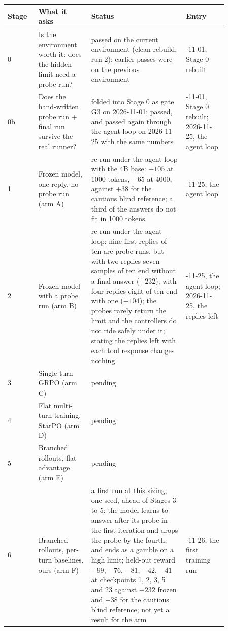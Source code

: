 \documentclass[11pt,a4paper]{article}
\begin{document}
\begin{center}\footnotesize
\begin{tabular}{@{}l >{\raggedright\arraybackslash}p{0.24\linewidth} >{\raggedright\arraybackslash}p{0.43\linewidth} >{\raggedright\arraybackslash}p{0.19\linewidth}@{}}
\toprule
Stage & What it asks & Status & Entry \\
\midrule
0  & Is the environment worth it: does the hidden limit need a probe run? & passed on the current environment (clean rebuild, run 2); earlier passes were on the previous environment & 2026-11-01, Stage 0 rebuilt \\
0b & Does the hand-written probe run + final run survive the real runner? & folded into Stage 0 as gate G3 on 2026-11-01; passed, and passed again through the agent loop on 2026-11-25 with the same numbers & 2026-11-01, Stage 0 rebuilt; 2026-11-25, the agent loop \\
1  & Frozen model, one reply, no probe run (arm A) & re-run under the agent loop with the 4B base: $-105$ at 1000 tokens, $-65$ at 4000, against $+38$ for the cautious blind reference; a third of the answers do not fit in 1000 tokens & 2026-11-25, the agent loop \\
2  & Frozen model with a probe run (arm B) & re-run under the agent loop: nine first replies of ten are probe runs, but with two replies seven samples of ten end without a final answer ($-232$); with four replies eight of ten end with one ($-104$); the probes rarely return the limit and the controllers do not ride safely under it; stating the replies left with each tool response changes nothing & 2026-11-25, the agent loop; 2026-11-25, the replies left \\
3  & Single-turn GRPO (arm C) & pending & \\
4  & Flat multi-turn training, StarPO (arm D) & pending & \\
5  & Branched rollouts, flat advantage (arm E) & pending & \\
6  & Branched rollouts, per-turn baselines, ours (arm F) & a first run at this sizing, one seed, ahead of Stages 3 to 5: the model learns to answer after its probe in the first iteration and drops the probe by the fourth, and ends as a gamble on a high limit; held-out reward $-99$, $-76$, $-81$, $-42$, $-41$ at checkpoints 1, 2, 3, 5 and 23 against $-232$ frozen and $+38$ for the cautious blind reference; not yet a result for the arm & 2026-11-26, the first training run \\
\bottomrule
\end{tabular}
\end{center}
\end{document}
